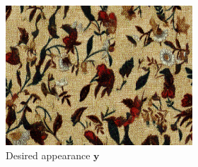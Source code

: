 \begin{figure}[]
    \begin{subfigure}{\textwidth}
        \centering
        \begin{subfigure}{0.2\textwidth}
            \centering
            \includegraphics[width=\textwidth]{images/04-experiment02/carpet/flowers2/target.jpg}
            \caption*{Desired appearance \(\bm{y}\)}
        \end{subfigure}
        \hfill
        \begin{subfigure}{0.78\textwidth}
            \centering
            \begin{subfigure}{0.32\textwidth}
                \centering
\end{subfigure}
\end{subfigure}
\end{subfigure}
\end{figure}
